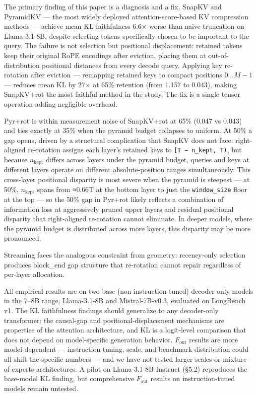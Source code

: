 \documentclass[10pt,letterpaper]{article}
\begin{document}
The primary finding of this paper is a diagnosis and a fix. SnapKV and
PyramidKV --- the most widely deployed attention-score-based KV
compression methods --- achieve mean KL faithfulness 6.6× worse than
naive truncation on Llama-3.1-8B, despite selecting tokens specifically
chosen to be important to the query. The failure is not selection but
positional displacement: retained tokens keep their original RoPE
encodings after eviction, placing them at out-of-distribution positional
distances from every decode query. Applying key re-rotation after
eviction --- remapping retained keys to compact positions
\(0 \ldots M-1\) --- reduces mean KL by 27× at 65\% retention (from
1.157 to 0.043), making SnapKV+rot the most faithful method in the
study. The fix is a
single tensor operation adding negligible overhead.

Pyr+rot is within measurement noise of SnapKV+rot at 65\% (0.047 vs
0.043) and ties exactly at 35\% when the pyramid budget collapses to
uniform. At 50\% a gap opens, driven by a structural complication that
SnapKV does not face: right-aligned re-rotation assigns each layer's
retained keys to \texttt{{[}T\ −\ n\_kept,\ T)}, but because
\(n_{\text{kept}}\) differs across layers under the pyramid budget,
queries and keys at different layers operate on different
absolute-position ranges simultaneously. This cross-layer positional
disparity is most severe when the pyramid is steepest --- at 50\%,
\(n_{\text{kept}}\) spans from ≈0.66T at the bottom layer to just the
\texttt{window\_size} floor at the top --- so the 50\% gap in Pyr+rot
likely reflects a combination of information loss at aggressively pruned
upper layers and residual positional disparity that right-aligned
re-rotation cannot eliminate. In deeper models, where the pyramid budget
is distributed across more layers, this disparity may be more
pronounced.

Streaming faces the analogous constraint from geometry: recency-only
selection produces block\_end gap structure that re-rotation cannot
repair regardless of per-layer allocation.

All empirical results are on two base (non-instruction-tuned)
decoder-only models in the 7--8B range, Llama-3.1-8B and
Mistral-7B-v0.3, evaluated on LongBench v1. The KL faithfulness findings
should generalize to any decoder-only transformer: the causal-gap and
positional-displacement mechanisms are properties of the attention
architecture, and KL is a logit-level comparison that does not depend on
model-specific generation behavior. \(F_{\text{out}}\) results are more
model-dependent --- instruction tuning, scale, and benchmark
distribution could all shift the specific numbers --- and we have not
tested larger scales or mixture-of-experts architectures. A pilot on
Llama-3.1-8B-Instruct (§5.2) reproduces the base-model KL finding, but
comprehensive \(F_{\text{out}}\) results on instruction-tuned models
remain untested.
\end{document}
